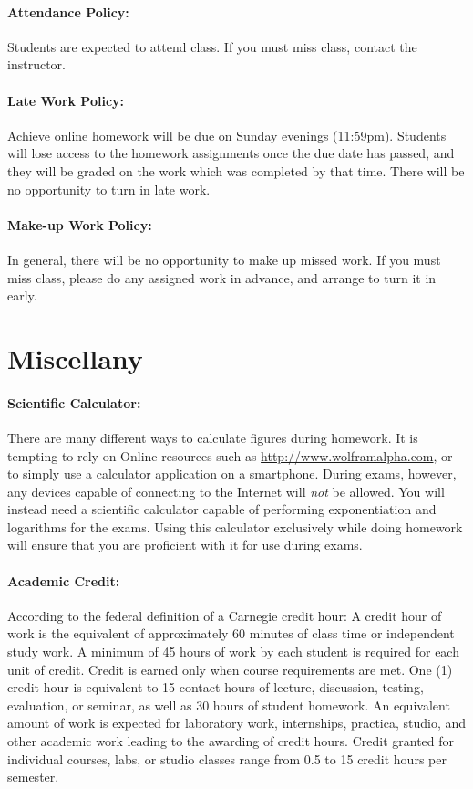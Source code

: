 \documentclass[12pt, letterpaper]{article}
\begin{document}
\paragraph{Attendance Policy:}
Students are expected to attend class. If you must miss class, contact the instructor.

\paragraph{Late Work Policy:}
Achieve online homework will be due on Sunday evenings (11:59pm). Students will lose access to the homework assignments once the due date has passed, and they will be graded on the work which was completed by that time. There will be no opportunity to turn in late work.

\paragraph{Make-up Work Policy:}
In general, there will be no opportunity to make up missed work. If you must miss class, please do any assigned work in advance, and arrange to turn it in early.

\section*{Miscellany}

\paragraph{Scientific Calculator:}
There are many different ways to calculate figures during homework. It is tempting to rely on Online resources such as \href{http://www.wolframalpha.com}{http://www.wolframalpha.com}, or to simply use a calculator application on a smartphone. During exams, however, any devices capable of connecting to the Internet will \emph{not} be allowed. You will instead need a scientific calculator capable of performing exponentiation and logarithms for the exams. Using this calculator exclusively while doing homework will ensure that you are proficient with it for use during exams.

\paragraph{Academic Credit:}
According to the federal definition of a Carnegie credit hour: A credit hour of work is the equivalent of approximately 60 minutes of class time or independent study work. A minimum of 45 hours of work by each student is required for each unit of credit. Credit is earned only when course requirements are met. One (1) credit hour is equivalent to 15 contact hours of lecture, discussion, testing, evaluation, or seminar, as well as 30 hours of student homework. An equivalent amount of work is expected for laboratory work, internships, practica, studio, and other academic work leading to the awarding of credit hours. Credit granted for individual courses, labs, or studio classes range from 0.5 to 15 credit hours per semester.
\end{document}
